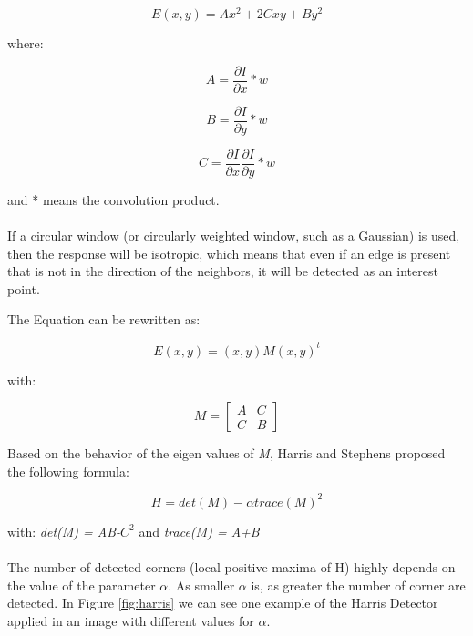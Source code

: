 \documentclass{article}
\begin{document}
	\begin{equation}
	E(x,y) = Ax^2 + 2Cxy + By^2
	\end{equation}
	
	where:
	
	\begin{equation}
	A = \frac{\partial I}{\partial x} * w
	\end{equation}

	\begin{equation}
	B = \frac{\partial I}{\partial y} * w
	\end{equation}

	\begin{equation}
	C = \frac{\partial I}{\partial x} \frac{\partial I}{\partial y} * w
	\end{equation}

	and  * means the convolution product.
	\\\\
	If a circular window (or circularly weighted window, such as a Gaussian) is used, then the response will be isotropic, which means that even if an edge is present that is not in the direction of the neighbors, it will be detected as an interest point.

	The Equation can be rewritten as:

	\begin{equation}
	E(x,y) = (x,y)M(x,y)^t
	\end{equation}
	
	with:

	\begin{equation}
	M = 	\begin{bmatrix}
		A&C\\
		C&B
		\end{bmatrix}
	\end{equation}

	Based on the behavior of the eigen values of \textit{M}, Harris and Stephens proposed the following formula:

	\begin{equation}
	H = det(M) - \alpha trace(M)^2
	\end{equation}

	with: \textit{det(M) = AB-$C^2$} and \textit{trace(M) = A+B}
	\\\\
	The number of detected corners (local positive maxima of H) highly depends on the value of the parameter \textit{$\alpha$}. As smaller \textit{$\alpha$} is, as greater the number of corner are detected. In Figure \ref{fig:harris} we can see one example of the Harris Detector applied in an image with different values for \textit{$\alpha$}.
\end{document}
